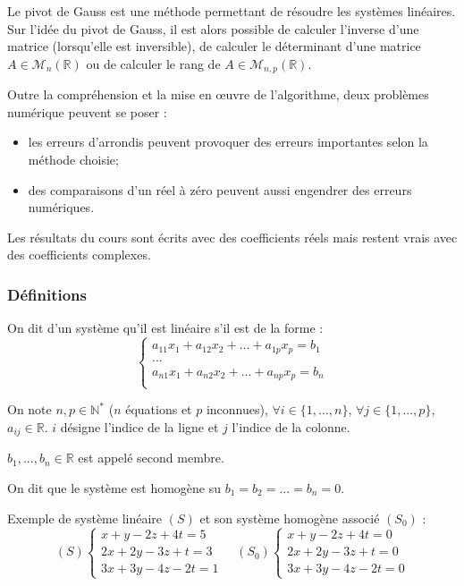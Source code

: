 {Le pivot de Gauss est une méthode permettant de résoudre les systèmes linéaires. Sur l'idée du pivot de Gauss, il est alors possible de calculer l'inverse d'une matrice (lorsqu'elle est inversible), de calculer le déterminant d'une matrice $A\in\mathcal{M}_n(\mathbb{R})$ ou de calculer le rang de 
$A\in\mathcal{M}_{n,p}(\mathbb{R})$.

Outre la compréhension et la mise en \oe{}uvre de l'algorithme, deux problèmes numérique peuvent se poser : 
\begin{itemize}
\item les erreurs d'arrondis peuvent provoquer des erreurs importantes selon la méthode choisie;
\item des comparaisons d'un réel à zéro peuvent aussi engendrer des erreurs numériques.
\end{itemize}

\begin{remarque}
Les résultats du cours sont écrits avec des coefficients réels mais restent vrais avec des coefficients complexes. 
\end{remarque}

\subsubsection{Définitions}
\begin{defi}
On dit d'un système qu'il est linéaire s'il est de la forme :
$$
\left\{
\begin{array}{l}
a_{11}x_1 + a_{12}x_2 + ... + a_{1p}x_p = b_1 \\
... \\ 
a_{n1}x_1 + a_{n2}x_2 + ... + a_{np}x_p = b_n \\
\end{array}
\right.
$$

On note $n,p\in \mathbb{N}^*$ ($n$ équations et $p$ inconnues), $\forall i\in \{1,...,n\}$, $\forall j\in \{1,...,p\}$, $a_{ij} \in \mathbb{R}$. $i$ désigne l'indice de la ligne et $j$ l'indice de la colonne. 

$b_1, ..., b_n \in \mathbb{R}$ est appelé second membre. 
\end{defi}

\begin{defi}
On dit que le système est homogène su $b_1=b_2=...=b_n=0$.
\end{defi}


\begin{exemple}
Exemple de système linéaire $(S)$ et son système homogène associé $(S_0)$ :
$$
(S) \left\{
\begin{array}{l}
x+y-2z + 4t = 5 \\
2x+2y-3z+t=3 \\
3x+3y-4z-2t=1
\end{array}
\right.
\quad
(S_0) \left\{
\begin{array}{l}
x+y-2z + 4t = 0 \\
2x+2y-3z+t=0 \\
3x+3y-4z-2t=0
\end{array}
\right.
$$


\end{exemple}}
